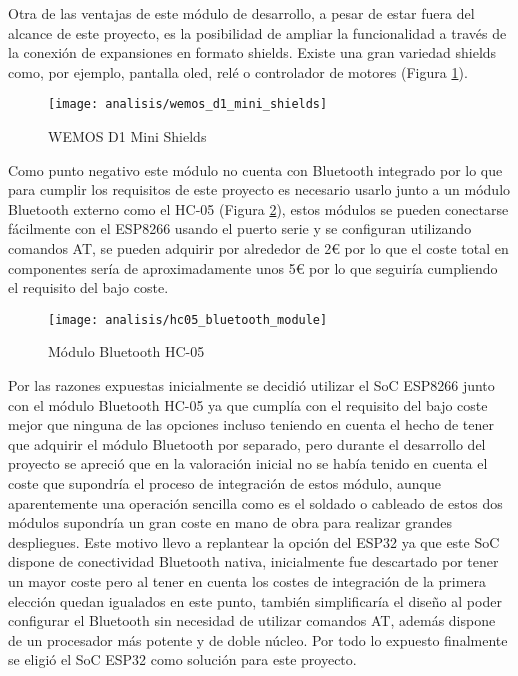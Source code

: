 \documentclass[../proyecto.tex]{subfiles}
\begin{document}
Otra de las ventajas de este módulo de desarrollo, a pesar de estar fuera del alcance de este proyecto, es la posibilidad de ampliar la funcionalidad a través de la conexión de expansiones en formato shields. Existe una gran variedad shields como, por ejemplo, pantalla oled, relé o controlador de motores (Figura \ref{fig:wemos_d1_mini_shields}).\\

\begin{figure}[H]
\centering
\texttt{[image: analisis/wemos\_d1\_mini\_shields]}
\caption{WEMOS D1 Mini Shields}
\label{fig:wemos_d1_mini_shields}
\end{figure}

Como punto negativo este módulo no cuenta con Bluetooth integrado por lo que para cumplir los requisitos de este proyecto es necesario usarlo junto a un módulo Bluetooth externo como el HC-05 (Figura \ref{fig:hc05_bluetooth_module}), estos módulos se pueden conectarse fácilmente con el ESP8266 usando el puerto serie y se configuran utilizando comandos AT, se pueden adquirir por alrededor de 2€ por lo que el coste total en componentes sería de aproximadamente unos 5€ por lo que seguiría cumpliendo el requisito del bajo coste.

\begin{figure}[H]
\centering
\texttt{[image: analisis/hc05\_bluetooth\_module]}
\caption{Módulo Bluetooth HC-05}
\label{fig:hc05_bluetooth_module}
\end{figure}

Por las razones expuestas inicialmente se decidió utilizar el SoC ESP8266 junto con el módulo Bluetooth HC-05 ya que cumplía con el requisito del bajo coste mejor que ninguna de las opciones incluso teniendo en cuenta el hecho de tener que adquirir el módulo Bluetooth por separado, pero durante el desarrollo del proyecto se apreció que en la valoración inicial no se había tenido en cuenta el coste que supondría el proceso de integración de estos módulo, aunque aparentemente una operación sencilla como es el soldado o cableado de estos dos módulos supondría un gran coste en mano de obra para realizar grandes despliegues. Este motivo llevo a replantear la opción del ESP32 ya que este SoC dispone de conectividad Bluetooth nativa, inicialmente fue descartado por tener un mayor coste pero al tener en cuenta los costes de integración de la primera elección quedan igualados en este punto, también simplificaría el diseño al poder configurar el Bluetooth sin necesidad de utilizar comandos AT, además dispone de un procesador más potente y de doble núcleo. Por todo lo expuesto finalmente se eligió el SoC ESP32 como solución para este proyecto.\\
\end{document}
